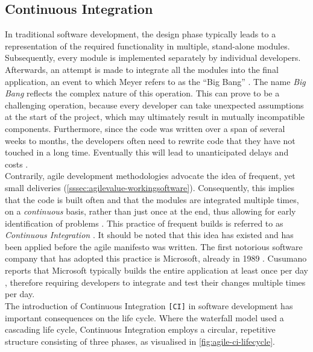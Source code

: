 
\subsection{Continuous Integration}
In traditional software development, the design phase typically leads to a representation of the required functionality in multiple, stand-alone modules. Subsequently, every module is implemented separately by individual developers. Afterwards, an attempt is made to integrate all the modules into the final application, an event to which Meyer refers to as the ``Big Bang'' \cite[~p.103]{Meyer2014}. The name \emph{Big Bang} reflects the complex nature of this operation. This can prove to be a challenging operation, because every developer can take unexpected assumptions at the start of the project, which may ultimately result in mutually incompatible components. Furthermore, since the code was written over a span of several weeks to months, the developers often need to rewrite code that they have not touched in a long time. Eventually this will lead to unanticipated delays and costs \cite{SmartJenkinsDefinitive}.\\ 

\noindent Contrarily, agile development methodologies advocate the idea of frequent, yet small deliveries (\autoref{sssec:agilevalue-workingsoftware}). Consequently, this implies that the code is built often and that the modules are integrated multiple times, on a \emph{continuous} basis, rather than just once at the end, thus allowing for early identification of problems \cite{gitlabci}. This practice of frequent builds is referred to as \emph{Continuous Integration} \cite{martin2014,Meyer2014}. It should be noted that this idea has existed and has been applied before the agile manifesto was written. The first notorious software company that has adopted this practice is Microsoft, already in 1989 \cite[~p.11]{cusumanomicrosoft}. Cusumano reports that Microsoft typically builds the entire application at least once per day \cite[~p.12]{cusumanomicrosoft}, therefore requiring developers to integrate and test their changes multiple times per day.\\

\noindent The introduction of Continuous Integration \texttt{[CI]} in software development has important consequences on the life cycle. Where the waterfall model used a cascading life cycle, Continuous Integration employs a circular, repetitive structure consisting of three phases, as visualised in \autoref{fig:agile-ci-lifecycle}.


